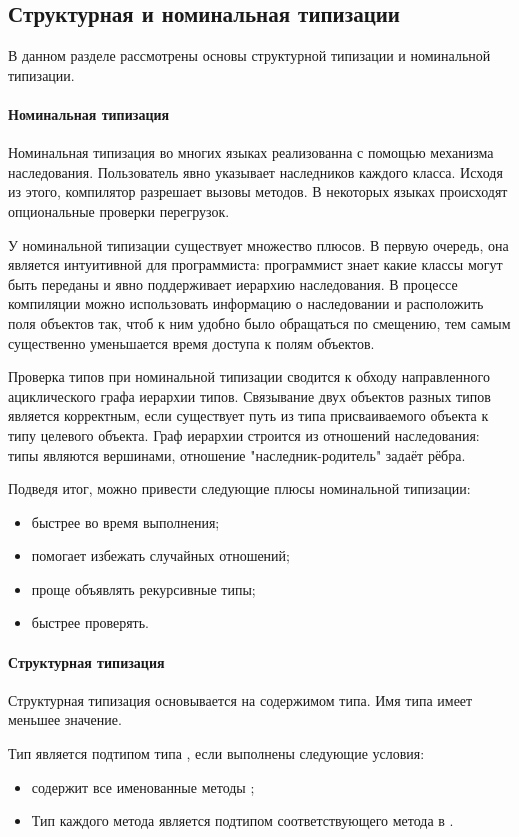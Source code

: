 \subsection{Структурная и номинальная типизации}
В данном разделе рассмотрены основы структурной типизации и номинальной типизации.

\paragraph{Номинальная типизация}
Номинальная типизация во многих языках реализованна с помощью механизма наследования\cite{book:pierce}. Пользователь явно указывает наследников каждого класса. Исходя из этого, компилятор разрешает вызовы методов. В некоторых языках происходят опциональные проверки перегрузок.

У номинальной типизации существует множество плюсов. В первую очередь, она является интуитивной для программиста: программист знает какие классы могут быть переданы и явно поддерживает иерархию наследования. В процессе компиляции можно использовать информацию о наследовании и расположить поля объектов так, чтоб к ним удобно было обращаться по смещению, тем самым существенно уменьшается время доступа к полям объектов.

Проверка типов при номинальной типизации сводится к обходу направленного ациклического графа иерархии типов. Связывание двух объектов разных типов является корректным, если существует путь из типа присваиваемого объекта к типу целевого объекта. Граф иерархии строится из отношений наследования: типы являются вершинами, отношение "наследник-родитель" задаёт рёбра.

Подведя итог, можно привести следующие плюсы номинальной типизации:
\begin{itemize}
    \item быстрее во время выполнения;
    \item помогает избежать случайных отношений;
    \item проще объявлять рекурсивные типы;
    \item быстрее проверять.
\end{itemize}

\paragraph{Структурная типизация}
Структурная типизация основывается на содержимом типа\cite{book:pierce}. Имя типа имеет меньшее значение.

Тип  является подтипом типа , если выполнены следующие условия:
\begin{itemize}
    \item {} содержит все именованные методы ;
    \item Тип каждого метода  является подтипом соответствующего метода в .
\end{itemize}

